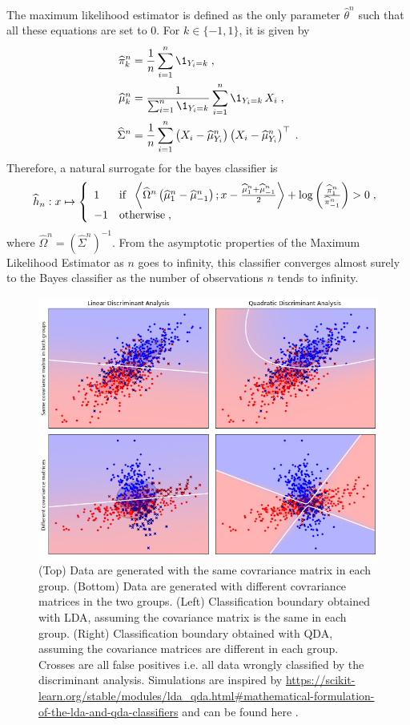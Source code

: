 The maximum likelihood estimator is defined as the only parameter $\widehat \theta^n$ such that all these equations are set to 0. For $k\in\{-1,1\}$,  it is given by
\begin{align*}
\widehat \pi_k^n &= \frac{1}{n}\sum_{i=1}^n\1_{Y_i=k}\eqsp,\\
\widehat \mu_k^n &= \frac{1}{\sum_{i=1}^n\1_{Y_i=k}}\sum_{i=1}^n\1_{Y_i=k}\,X_i\eqsp,\\
\widehat\Sigma^n &= \frac{1}{n}\sum_{i=1}^n \left(X_i - \widehat \mu_{Y_i}^n\right)\left(X_i - \widehat \mu_{Y_i}^n\right)^\top\eqsp.
\end{align*}
Therefore, a natural surrogate for the bayes classifier is
\[
\widehat h_{n}: x\mapsto  \left\{
    \begin{array}{ll}
       1 & \mbox{if }\; \left\langle \widehat{\Omega}^n \left(\widehat\mu^n_1-\widehat\mu^n_{-1}\right);x - \frac{\widehat\mu^n_1  +\widehat\mu^n_{-1}}{2}\right\rangle + \log\left(\frac{\widehat\pi^n_{1}}{\widehat\pi^n_{-1}}\right)>0\;, \\
        -1 & \mbox{otherwise}\;,
    \end{array}
\right.
\]
where $\widehat{\Omega}^n = (\widehat\Sigma^n)^{-1}$. From the asymptotic properties of the Maximum Likelihood Estimator as $n$ goes to infinity, this  classifier converges almost surely to the Bayes classifier as the number of observations $n$ tends to infinity.

\begin{figure}
\begin{center}
\includegraphics[width = .8\linewidth]{./Illustrations/lda_plot.png}
\end{center}
\caption{(Top) Data are generated with the same covrariance matrix in each group. (Bottom) Data are generated with different covrariance matrices in the two groups.  (Left) Classification boundary obtained with LDA, assuming the covariance matrix is the same in each group. (Right)  Classification boundary obtained with QDA, assuming the covariance matrices are different in each group. Crosses are all false positives i.e. all data wrongly classified by the discriminant analysis. Simulations are inspired by \url{https://scikit-learn.org/stable/modules/lda_qda.html\#mathematical-formulation-of-the-lda-and-qda-classifiers} and can be found here \cite{https://sylvainlc.github.io/}.}
\end{figure}


